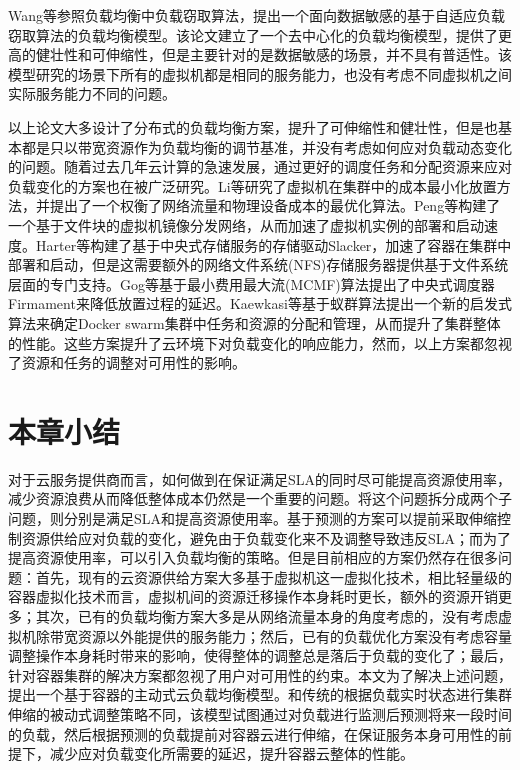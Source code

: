 Wang等参照负载均衡中负载窃取算法，提出一个面向数据敏感的基于自适应负载窃取算法的负载均衡模型\cite{wang2014optimizing}。该论文建立了一个去中心化的负载均衡模型，提供了更高的健壮性和可伸缩性，但是主要针对的是数据敏感的场景，并不具有普适性。该模型研究的场景下所有的虚拟机都是相同的服务能力，也没有考虑不同虚拟机之间实际服务能力不同的问题。

以上论文大多设计了分布式的负载均衡方案，提升了可伸缩性和健壮性，但是也基本都是只以带宽资源作为负载均衡的调节基准，并没有考虑如何应对负载动态变化的问题。随着过去几年云计算的急速发展，通过更好的调度任务和分配资源来应对负载变化的方案也在被广泛研究。Li等研究了虚拟机在集群中的成本最小化放置方法，并提出了一个权衡了网络流量和物理设备成本的最优化算法\cite{li2014let}。Peng等构建了一个基于文件块的虚拟机镜像分发网络，从而加速了虚拟机实例的部署和启动速度\cite{peng2012vdn}。Harter等构建了基于中央式存储服务的存储驱动Slacker，加速了容器在集群中部署和启动，但是这需要额外的网络文件系统(NFS)存储服务器提供基于文件系统层面的专门支持\cite{harter2016slacker}。Gog等基于最小费用最大流(MCMF)算法提出了中央式调度器Firmament来降低放置过程的延迟\cite{gog2016firmament}。Kaewkasi等基于蚁群算法提出一个新的启发式算法来确定Docker swarm集群中任务和资源的分配和管理，从而提升了集群整体的性能\cite{kaewkasi2017improvement}。这些方案提升了云环境下对负载变化的响应能力，然而，以上方案都忽视了资源和任务的调整对可用性的影响。

\section{本章小结}
对于云服务提供商而言，如何做到在保证满足SLA的同时尽可能提高资源使用率，减少资源浪费从而降低整体成本仍然是一个重要的问题。将这个问题拆分成两个子问题，则分别是满足SLA和提高资源使用率。基于预测的方案可以提前采取伸缩控制资源供给应对负载的变化，避免由于负载变化来不及调整导致违反SLA；而为了提高资源使用率，可以引入负载均衡的策略。但是目前相应的方案仍然存在很多问题：首先，现有的云资源供给方案大多基于虚拟机这一虚拟化技术，相比轻量级的容器虚拟化技术而言，虚拟机间的资源迁移操作本身耗时更长，额外的资源开销更多；其次，已有的负载均衡方案大多是从网络流量本身的角度考虑的，没有考虑虚拟机除带宽资源以外能提供的服务能力；然后，已有的负载优化方案没有考虑容量调整操作本身耗时带来的影响，使得整体的调整总是落后于负载的变化了；最后，针对容器集群的解决方案都忽视了用户对可用性的约束。本文为了解决上述问题，提出一个基于容器的主动式云负载均衡模型。和传统的根据负载实时状态进行集群伸缩的被动式调整策略不同，该模型试图通过对负载进行监测后预测将来一段时间的负载，然后根据预测的负载提前对容器云进行伸缩，在保证服务本身可用性的前提下，减少应对负载变化所需要的延迟，提升容器云整体的性能。